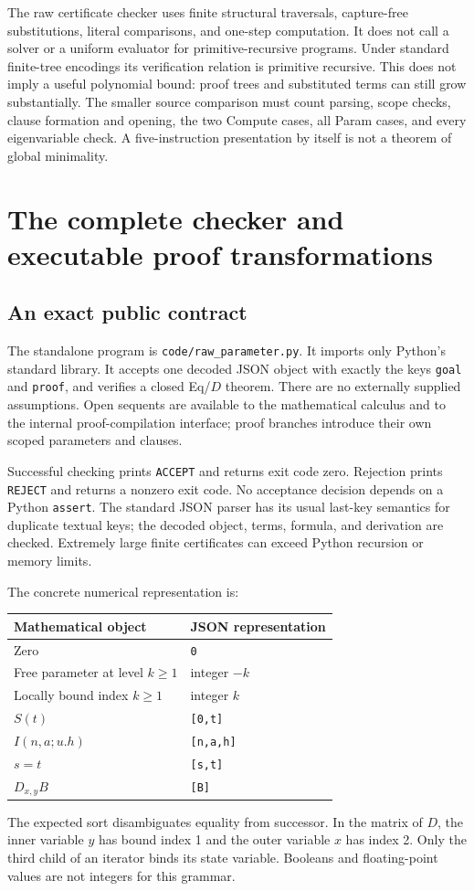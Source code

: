 \documentclass[11pt,letterpaper]{article}
\begin{document}
The raw certificate checker uses finite structural traversals,
capture-free substitutions, literal comparisons, and one-step computation.
It does not call a solver or a uniform evaluator for primitive-recursive
programs.  Under standard finite-tree encodings its verification relation
is primitive recursive.  This does not imply a useful polynomial bound:
proof trees and substituted terms can still grow substantially.
The smaller source comparison must count parsing, scope checks, clause
formation and opening, the two Compute cases, all Param cases, and every
eigenvariable check.  A five-instruction presentation by itself is not
a theorem of global minimality.


\section{The complete checker and executable proof transformations}

\subsection{An exact public contract}

The standalone program is \texttt{code/raw\_parameter.py}. It imports only
Python's standard library. It accepts one decoded JSON object with
exactly the keys \texttt{goal} and \texttt{proof}, and verifies a closed
Eq/$D$ theorem. There are no externally supplied assumptions. Open
sequents are available to the mathematical calculus and to the internal
proof-compilation interface; proof branches introduce their own scoped
parameters and clauses.

Successful checking prints \texttt{ACCEPT} and returns exit code zero.
Rejection prints \texttt{REJECT} and returns a nonzero exit code. No
acceptance decision depends on a Python \texttt{assert}. The standard
JSON parser has its usual last-key semantics for duplicate textual keys;
the decoded object, terms, formula, and derivation are checked. Extremely
large finite certificates can exceed Python recursion or memory limits.

The concrete numerical representation is:
\begin{center}
\begin{tabular}{ll}
\toprule
Mathematical object & JSON representation\\
\midrule
Zero & \texttt{0}\\
Free parameter at level $k\geq1$ & integer $-k$\\
Locally bound index $k\geq1$ & integer $k$\\
$S(t)$ & \texttt{[0,t]}\\
$I(n,a;u.h)$ & \texttt{[n,a,h]}\\
$s=t$ & \texttt{[s,t]}\\
$D_{x,y}B$ & \texttt{[B]}\\
\bottomrule
\end{tabular}
\end{center}
The expected sort disambiguates equality from successor. In the matrix of
$D$, the inner variable $y$ has bound index 1 and the outer variable $x$
has index 2. Only the third child of an iterator binds its state variable.
Booleans and floating-point values are not integers for this grammar.
\end{document}
